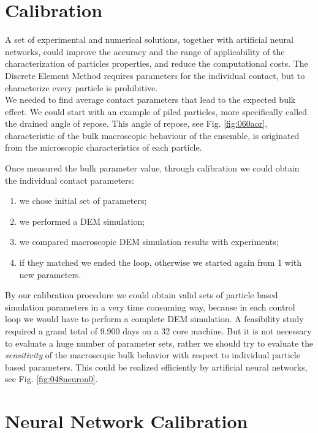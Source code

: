 \section{Calibration}
\label{sec:calibration}

A set of experimental and numerical solutions, together with artificial neural
networks, could improve the accuracy and the range of applicability of the
characterization of particles properties, and reduce the computational costs.
The Discrete Element Method requires parameters for the individual contact, but
to characterize every particle is prohibitive.\\
We needed to find average contact parameters that lead to the expected bulk
effect.
We could start with an example of piled particles, more specifically called the
drained angle of repose. This angle of repose, see Fig. \ref{fig:060aor},
characteristic of the bulk macroscopic behaviour of the ensemble, is originated from the microscopic
characteristics of each particle.

Once measured the bulk parameter value, through calibration we could obtain the
individual contact parameters:
\begin{enumerate}
\item{we chose initial set of parameters;}
\item{we performed a DEM simulation;}
\item{we compared macroscopic DEM simulation results with experiments;}
\item{if they matched we ended the loop, otherwise we started again from 1 with
new parameters.}
\end{enumerate}
By our calibration procedure we could obtain valid sets of particle based
simulation parameters in a very time consuming way, because in each control loop
we would have to perform a complete \acs{DEM} simulation.
A feasibility study \citet{RefWorks:173}
required a grand total of
9.900 days on a 32 core machine. 
But it is not necessary to evaluate a huge number of parameter sets,
rather we should try to evaluate the \textit{sensitivity} 
of the macroscopic bulk behavior with respect to individual particle based parameters.
This could be realized efficiently by artificial neural networks, see Fig.
\ref{fig:048neuron0}. 

\section{Neural Network Calibration}
\label{sec:neuralnetworkcalibration}

